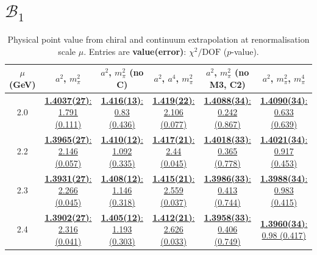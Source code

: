 \documentclass[12pt]{extarticle}
\begin{document}
\section{$\mathcal{B}_1$}
\begin{table}[h!]
\begin{center}
\begin{tabular}{|c|c|c|c|c|c|}
\hline
$\mu$ (GeV) & $a^2$, $m_\pi^2$& $a^2$, $m_\pi^2$ (no C)& $a^2$, $a^4$, $m_\pi^2$& $a^2$, $m_\pi^2$ (no M3, C2)& $a^2$, $m_\pi^2$, $m_\pi^4$\\
\hline
2.0& \hyperlink{VVpAA/SUSY/a2m2_20.pdf.1}{\textbf{1.4037(27)}: 1.791 (0.111)} & \hyperlink{VVpAA/SUSY/a2m2noC_20.pdf.1}{\textbf{1.416(13)}: 0.83 (0.436)} & \hyperlink{VVpAA/SUSY/a2a4m2_20.pdf.1}{\textbf{1.419(22)}: 2.106 (0.077)} & \hyperlink{VVpAA/SUSY/a2m2mcut_20.pdf.1}{\textbf{1.4088(34)}: 0.242 (0.867)} & \hyperlink{VVpAA/SUSY/a2m2m4_20.pdf.1}{\textbf{1.4090(34)}: 0.633 (0.639)}\\
2.2& \hyperlink{VVpAA/SUSY/a2m2_22.pdf.1}{\textbf{1.3965(27)}: 2.146 (0.057)} & \hyperlink{VVpAA/SUSY/a2m2noC_22.pdf.1}{\textbf{1.410(12)}: 1.092 (0.335)} & \hyperlink{VVpAA/SUSY/a2a4m2_22.pdf.1}{\textbf{1.417(21)}: 2.44 (0.045)} & \hyperlink{VVpAA/SUSY/a2m2mcut_22.pdf.1}{\textbf{1.4018(33)}: 0.365 (0.778)} & \hyperlink{VVpAA/SUSY/a2m2m4_22.pdf.1}{\textbf{1.4021(34)}: 0.917 (0.453)}\\
2.3& \hyperlink{VVpAA/SUSY/a2m2_23.pdf.1}{\textbf{1.3931(27)}: 2.266 (0.045)} & \hyperlink{VVpAA/SUSY/a2m2noC_23.pdf.1}{\textbf{1.408(12)}: 1.146 (0.318)} & \hyperlink{VVpAA/SUSY/a2a4m2_23.pdf.1}{\textbf{1.415(21)}: 2.559 (0.037)} & \hyperlink{VVpAA/SUSY/a2m2mcut_23.pdf.1}{\textbf{1.3986(33)}: 0.413 (0.744)} & \hyperlink{VVpAA/SUSY/a2m2m4_23.pdf.1}{\textbf{1.3988(34)}: 0.983 (0.415)}\\
2.4& \hyperlink{VVpAA/SUSY/a2m2_24.pdf.1}{\textbf{1.3902(27)}: 2.316 (0.041)} & \hyperlink{VVpAA/SUSY/a2m2noC_24.pdf.1}{\textbf{1.405(12)}: 1.193 (0.303)} & \hyperlink{VVpAA/SUSY/a2a4m2_24.pdf.1}{\textbf{1.412(21)}: 2.626 (0.033)} & \hyperlink{VVpAA/SUSY/a2m2mcut_24.pdf.1}{\textbf{1.3958(33)}: 0.406 (0.749)} & \hyperlink{VVpAA/SUSY/a2m2m4_24.pdf.1}{\textbf{1.3960(34)}: 0.98 (0.417)}\\
\hline
\end{tabular}
\caption{Physical point value from chiral and continuum extrapolation at renormalisation scale $\mu$. Entries are \textbf{value(error)}: $\chi^2/\text{DOF}$ ($p$-value).}
\end{center}
\end{table}
\end{document}

